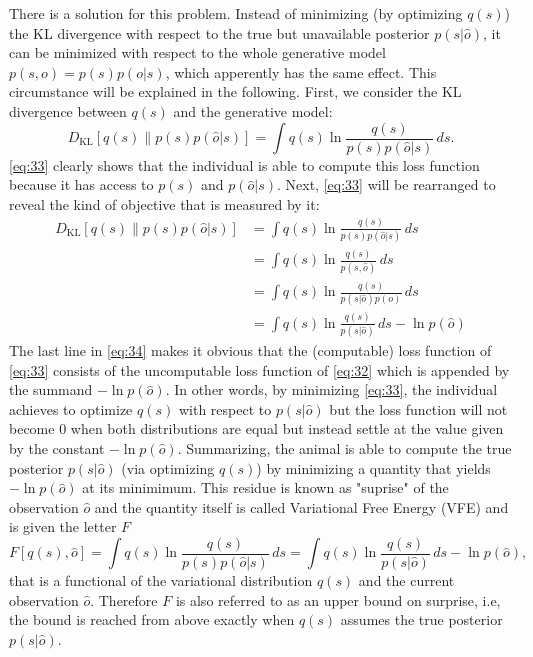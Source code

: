 There is a solution for this problem. Instead of minimizing (by optimizing \(q(s)\)) the KL divergence with respect to the true but unavailable posterior \(p(s|\hat o)\), it can be minimized with respect to the whole generative model \(p(s,o)=p(s)p(o|s)\), which apperently has the same effect. This circumstance will be explained in the following. First, we consider the KL divergence between \(q(s)\) and the generative model:
\begin{equation}
    D_{\text{KL}}[q(s) \parallel p(s)p(\hat o|s)] = \int q(s) \ln \frac{q(s)}{p(s)p(\hat o|s)} \, ds.
    \label{eq:33}
\end{equation}
\cref{eq:33} clearly shows that the individual is able to compute this loss function because it has access to \(p(s)\) and \(p(\hat o|s)\). Next, \cref{eq:33} will be rearranged to reveal the kind of objective that is measured by it:
\begin{equation}
    \begin{split}
        D_{\text{KL}}[q(s) \parallel p(s)p(\hat o|s)] & = \int q(s) \ln \frac{q(s)}{p(s)p(\hat o|s)} \, ds             \\
                                                      & = \int q(s) \ln \frac{q(s)}{p(s,\hat o)} \, ds                 \\
                                                      & = \int q(s) \ln \frac{q(s)}{p(s|\hat o)p(o)} \, ds             \\
                                                      & = \int q(s) \ln \frac{q(s)}{p(s|\hat o)} \, ds - \ln p(\hat o)
        \label{eq:34}
    \end{split}
\end{equation}
The last line in \cref{eq:34} makes it obvious that the (computable) loss function of \cref{eq:33} consists of the uncomputable loss function of \cref{eq:32} which is appended by the summand \(- \ln p(\hat o)\). In other words, by minimizing \cref{eq:33}, the individual achieves to optimize \(q(s)\) with respect to \(p(s|\hat o)\) but the loss function will not become 0 when both distributions are equal but instead settle at the value given by the constant \(- \ln p(\hat o)\). Summarizing, the animal is able to compute the true posterior \(p(s|\hat o)\) (via optimizing \(q(s)\)) by minimizing a quantity that yields \(- \ln p(\hat o)\) at its minimimum. This residue is known as "suprise" of the observation \(\hat o\) and the quantity itself is called Variational Free Energy (VFE) and is given the letter \(F\)
\begin{equation}
    F[q(s), \hat o] = \int q(s) \ln \frac{q(s)}{p(s)p(\hat o|s)} \, ds = \int q(s) \ln \frac{q(s)}{p(s|\hat o)} \, ds - \ln p(\hat o),
\end{equation}
that is a functional of the variational distribution \(q(s)\) and the current observation \(\hat o\). Therefore \(F\) is also referred to as an upper bound on surprise, i.e, the bound is reached from above exactly when \(q(s)\) assumes the true posterior \(p(s|\hat o)\).

